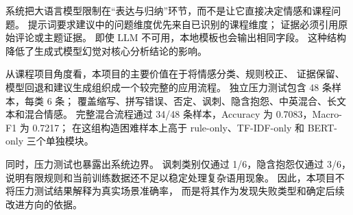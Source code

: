 系统把大语言模型限制在“表达与归纳”环节，而不是让它直接决定情感和课程问题。
提示词要求建议中的问题维度优先来自已识别的课程维度；
证据必须引用原始评论或主题证据。
即使 LLM 不可用，本地模板也会输出相同字段。
这种结构降低了生成式模型幻觉对核心分析结论的影响。

从课程项目角度看，本项目的主要价值在于将情感分类、规则校正、
证据保留、模型回退和建议生成组织成一个较完整的应用流程。
独立压力测试包含 48 条样本，每类 6 条；
覆盖缩写、拼写错误、否定、讽刺、隐含抱怨、中英混合、长文本和混合情感。
完整混合流程通过 34/48 条样本，Accuracy 为 0.7083，Macro-F1 为 0.7217；
在这组构造困难样本上高于 rule-only、TF-IDF-only 和 BERT-only 三个单独模块。

同时，压力测试也暴露出系统边界。
讽刺类别仅通过 1/6，隐含抱怨仅通过 3/6，
说明有限规则和当前训练数据还不足以稳定处理复杂语用现象。
因此，本项目不将压力测试结果解释为真实场景准确率，
而是将其作为发现失败类型和确定后续改进方向的依据。
